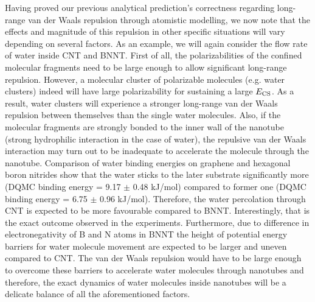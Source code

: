 \documentclass[aps,prl,groupaddress, twocolumn]{revtex4-1}
\begin{document}
Having proved our previous analytical prediction's correctness regarding long-range van der Waals repulsion through atomistic modelling, we now note that the effects and magnitude of this repulsion in other specific situations will vary depending on several factors. As an example, we will again consider the flow rate of water inside CNT and BNNT. First of all, the polarizabilities of the confined molecular fragments need to be large enough to allow significant long-range repulsion. However, a molecular cluster of polarizable molecules (e.g. water clusters) indeed will have large polarizability \cite{hammond_2009} for sustaining a large $E_{\rm CS}$. As a result, water clusters will experience a stronger long-range van der Waals repulsion between themselves than the single water molecules. Also, if the molecular fragments are strongly bonded to the inner wall of the nanotube (strong hydrophilic interaction in the case of water), the repulsive van der Waals interaction may turn out to be inadequate to accelerate the molecule through the nanotube. Comparison of water binding energies on graphene and hexagonal boron nitrides show that the water sticks to the later substrate significantly more (DQMC binding energy = 9.17 $\pm$ 0.48 kJ/mol) compared to former one (DQMC binding energy = 6.75 $\pm$ 0.96 kJ/mol)\cite{Al-Hamdani_CNT_2017, Al-Hamdani_BNNT_2017}. Therefore, the water percolation through CNT is expected to be more favourable compared to BNNT. Interestingly, that is the exact outcome observed in the experiments\cite{secchi2016massive}. Furthermore, due to difference in electronegativity of B and N atoms in BNNT the height of potential energy barriers for water molecule movement are expected to be larger and uneven compared to CNT. The van der Waals repulsion would have to be large enough to overcome these barriers to accelerate water molecules through nanotubes and therefore, the exact dynamics of water molecules inside nanotubes will be a delicate balance of all the aforementioned factors.\\ 
\end{document}
